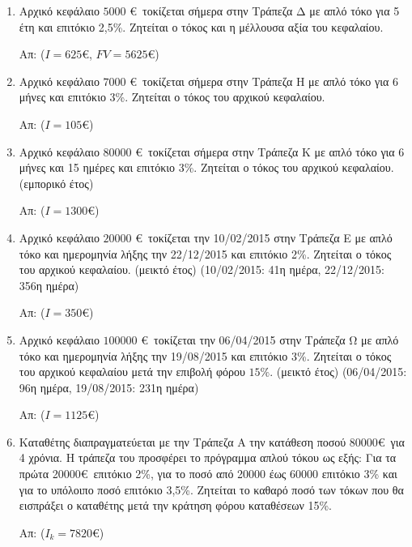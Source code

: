 \documentclass[a4paper,12pt]{article}
\begin{document}
\begin{center}
\end{center}

\begin{enumerate}

\item Αρχικό κεφάλαιο $5000$ \euro\ τοκίζεται σήμερα στην Τράπεζα Δ με απλό τόκο για 5 έτη και επιτόκιο 2,5\%. Ζητείται ο τόκος και η μέλλουσα αξία του κεφαλαίου.

 \hfill Απ: ($I=625$\euro, $FV=5625$\euro)

\item Αρχικό κεφάλαιο $7000$ \euro\ τοκίζεται σήμερα στην Τράπεζα H με απλό τόκο για 6 μήνες και επιτόκιο 3\%. Ζητείται ο τόκος του αρχικού κεφαλαίου.

 \hfill Απ: ($I=105$\euro)
 
  \item Αρχικό κεφάλαιο $80000$ \euro\ τοκίζεται σήμερα στην Τράπεζα Κ με απλό τόκο για 6 μήνες και 15 ημέρες και επιτόκιο 3\%. Ζητείται ο τόκος του αρχικού κεφαλαίου. (εμπορικό έτος) 

 \hfill Απ: ($I=1300$\euro)

 \item Αρχικό κεφάλαιο $20000$ \euro\ τοκίζεται την 10/02/2015 στην Τράπεζα Ε με απλό τόκο και ημερομηνία λήξης την 22/12/2015 και επιτόκιο 2\%. Ζητείται ο τόκος του αρχικού κεφαλαίου. (μεικτό έτος) (10/02/2015: 41η ημέρα, 22/12/2015: 356η ημέρα)

 \hfill Απ: ($I=350$\euro)
 
  \item Αρχικό κεφάλαιο $100000$ \euro\ τοκίζεται την 06/04/2015 στην Τράπεζα Ω με απλό τόκο και ημερομηνία λήξης την 19/08/2015 και επιτόκιο 3\%. Ζητείται ο τόκος του αρχικού κεφαλαίου μετά την επιβολή φόρου $15\%$. (μεικτό έτος) (06/04/2015: 96η ημέρα, 19/08/2015: 231η ημέρα)

 \hfill Απ: ($I=1125$\euro)
 
 \item Καταθέτης διαπραγματεύεται με την Τράπεζα Α την κατάθεση ποσού 80000\euro\ για 4 χρόνια. Η τράπεζα του προσφέρει το πρόγραμμα απλού τόκου ως εξής: Για τα πρώτα 20000\euro\ επιτόκιο 2\%, για το ποσό από 20000 έως 60000 επιτόκιο 3\% και για το υπόλοιπο ποσό επιτόκιο 3,5\%. Ζητείται το καθαρό ποσό των τόκων που θα εισπράξει ο καταθέτης μετά την κράτηση φόρου καταθέσεων 15\%.
 
 \hfill Απ: ($Ι_k=7820$\euro)
 

\end{enumerate}
\end{document}
